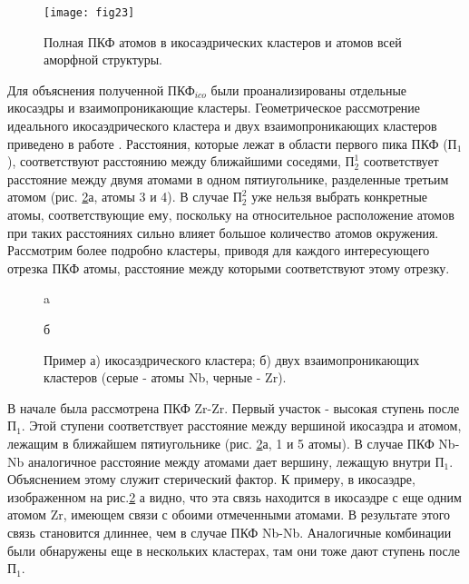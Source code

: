 \begin{figure}[h!]
	\begin{center}
		\texttt{[image: fig23]}{}{}{}
		\caption{Полная ПКФ атомов в икосаэдрических кластеров и атомов всей аморфной структуры.}
		\label{RDF_full_ico}
	\end{center}
\end{figure}
Для объяснения полученной $\text{ПКФ}_{ico}$ были проанализированы отдельные икосаэдры и взаимопроникающие кластеры.  Геометрическое рассмотрение идеального икосаэдрического кластера и двух взаимопроникающих кластеров приведено в  работе \cite{Liang}. Расстояния, которые лежат в области первого пика ПКФ ($\text{П}_1$), соответствуют расстоянию между ближайшими соседями, $\text{П}_2^1$ соответствует расстояние между двумя атомами в одном пятиугольнике, разделенные третьим атомом (рис. \ref{icosahedra_ex}а, атомы 3 и 4). В случае $\text{П}_2^2$ уже нельзя выбрать конкретные атомы, соответствующие ему, поскольку на относительное расположение атомов при таких расстояниях сильно влияет большое количество атомов окружения. Рассмотрим более подробно кластеры, приводя для каждого интересующего отрезка ПКФ атомы, расстояние между которыми соответствуют этому отрезку. 
\begin{figure}[h!]
	\begin{minipage}[h]{0.5\linewidth}
		 a \\
	\end{minipage}
	\hfill
	\begin{minipage}[h]{0.5\linewidth}
		 б\\
	\end{minipage}
	\caption{ Пример а)  икосаэдрического кластера; б) двух взаимопроникающих кластеров (серые - атомы Nb, черные - Zr).}
	\label{icosahedra_ex}
\end{figure}
В начале была рассмотрена ПКФ Zr-Zr. Первый  участок - высокая ступень после $\text{П}_1$. Этой ступени соответствует расстояние между вершиной икосаэдра и атомом, лежащим в ближайшем пятиугольнике (рис. \ref{icosahedra_ex}а, 1 и 5 атомы). В случае ПКФ Nb-Nb аналогичное расстояние между атомами дает вершину, лежащую внутри $\text{П}_1$. Объяснением этому служит стерический фактор. К примеру, в икосаэдре, изображенном на рис.\ref{icosahedra_ex} а видно, что эта связь находится в икосаэдре  с еще одним атомом Zr, имеющем связи с обоими отмеченными атомами. В результате этого связь становится длиннее, чем в случае ПКФ Nb-Nb.  Аналогичные комбинации были обнаружены еще в нескольких кластерах, там они тоже дают ступень после $\text{П}_1$. 

